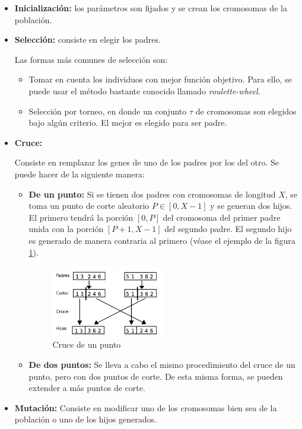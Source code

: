 \begin{itemize}
\item {\bf Inicialización:} los parámetros son fijados y se
crean los cromosomas de la población.
\item {\bf Selección:} consiste en elegir los padres. 

Las formas más comunes de selección son:

\begin{itemize}
\item Tomar en cuenta los individuos con mejor función objetivo. Para ello, se
puede usar el método bastante conocido llamado \textit{roulette-wheel}.
\item Selección por torneo, en donde un conjunto $\tau$ de cromosomas son
elegidos bajo algún criterio. El mejor es elegido para ser padre.
\end{itemize}

\item {\bf Cruce:}

Consiste en remplazar los genes de uno de los padres por los del otro. Se puede
hacer de la siguiente manera:

\begin{itemize}
\item {\bf De un punto:} Si se tienen dos padres con cromosomas de longitud $X$,
se toma un punto de corte aleatorio $P \in [0, X-1]$ y se generan dos hijos. El
primero tendrá la porción $[0, P]$ del cromosoma del primer padre unida con la
porción $[P + 1, X - 1]$ del segundo padre. El segundo hijo es generado de
manera contraria al primero (véase el ejemplo de la figura \ref{gen: point}).
\begin{figure}[h!]
    \centering
    \includegraphics[width=0.5\textwidth]{./figures/cruce.png}
    \caption{Cruce de un punto}
    \label{gen: point}
\end{figure}
\item {\bf De dos puntos:} Se lleva a cabo el mismo procedimiento del cruce de
un punto, pero con dos puntos de corte. De esta misma forma, se pueden extender
a más puntos de corte.
\end{itemize}

\item {\bf Mutación:}
Consiste en modificar uno de los cromosomas bien sea de la población
o uno de los hijos generados.
\end{itemize}

